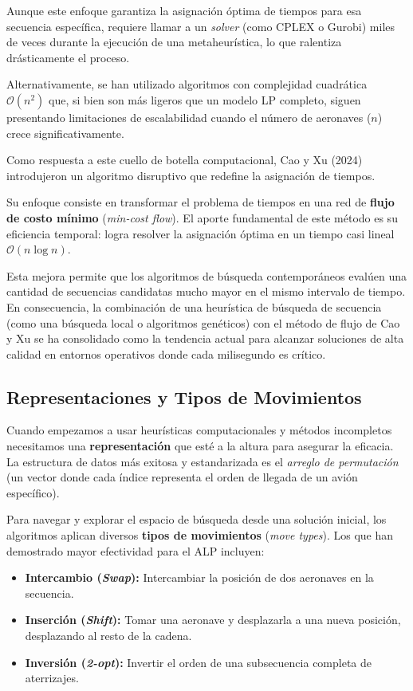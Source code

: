 \documentclass[letter, 10pt]{article}
\begin{document}
Aunque este enfoque garantiza la asignaci\'on \'optima de tiempos para esa secuencia espec\'ifica, requiere llamar a un \textit{solver} (como CPLEX o Gurobi) miles de veces durante la ejecuci\'on de una metaheur\'istica, lo que ralentiza dr\'asticamente el proceso. 

Alternativamente, se han utilizado algoritmos con complejidad cuadr\'atica $\mathcal{O}(n^2)$ que, si bien son m\'as ligeros que un modelo LP completo, siguen presentando limitaciones de escalabilidad cuando el n\'umero de aeronaves ($n$) crece significativamente.

Como respuesta a este cuello de botella computacional, Cao y Xu (2024)\cite{cao2024} introdujeron un algoritmo disruptivo que redefine la asignaci\'on de tiempos. 

Su enfoque consiste en transformar el problema de tiempos en una red de \textbf{flujo de costo m\'inimo} (\textit{min-cost flow}). El aporte fundamental de este m\'etodo es su eficiencia temporal: logra resolver la asignaci\'on \'optima en un tiempo casi lineal $\mathcal{O}(n \log n)$. 

Esta mejora permite que los algoritmos de b\'usqueda contempor\'aneos eval\'uen una cantidad de secuencias candidatas mucho mayor en el mismo intervalo de tiempo. En consecuencia, la combinaci\'on de una heur\'istica de b\'usqueda de secuencia (como una b\'usqueda local o algoritmos gen\'eticos) con el m\'etodo de flujo de Cao y Xu se ha consolidado como la tendencia actual para alcanzar soluciones de alta calidad en entornos operativos donde cada milisegundo es cr\'itico.

\subsection{Representaciones y Tipos de Movimientos}

Cuando empezamos a usar heur\'isticas computacionales y m\'etodos incompletos necesitamos una \textbf{representaci\'on} que est\'e a la altura para asegurar la eficacia.
La estructura de datos m\'as exitosa y estandarizada es el \textit{arreglo de permutaci\'on} (un vector donde cada \'indice representa el orden de llegada de un avi\'on espec\'ifico).

Para navegar y explorar el espacio de b\'usqueda desde una soluci\'on inicial, los algoritmos aplican diversos 
\textbf{tipos de movimientos} (\textit{move types}). 
Los que han demostrado mayor efectividad para el ALP incluyen:
\begin{itemize}
    \item \textbf{Intercambio (\textit{Swap}):} Intercambiar la posici\'on de dos aeronaves en la secuencia.
    \item \textbf{Inserci\'on (\textit{Shift}):} Tomar una aeronave y desplazarla a una nueva posici\'on, desplazando al resto de la cadena.
    \item \textbf{Inversi\'on (\textit{2-opt}):} Invertir el orden de una subsecuencia completa de aterrizajes.
\end{itemize}
\end{document}
